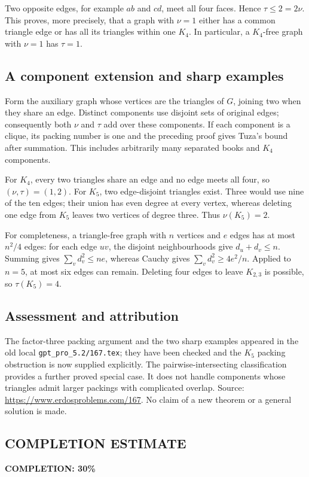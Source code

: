 Two opposite edges, for example $ab$ and $cd$, meet all four faces. Hence $\tau\le2=2\nu$. This proves, more precisely, that a graph with $\nu=1$ either has a common triangle edge or has all its triangles within one $K_4$. In particular, a $K_4$-free graph with $\nu=1$ has $\tau=1$.

\subsection*{A component extension and sharp examples}
Form the auxiliary graph whose vertices are the triangles of $G$, joining two when they share an edge. Distinct components use disjoint sets of original edges; consequently both $\nu$ and $\tau$ add over these components. If each component is a clique, its packing number is one and the preceding proof gives Tuza's bound after summation. This includes arbitrarily many separated books and $K_4$ components.

For $K_4$, every two triangles share an edge and no edge meets all four, so $(\nu,\tau)=(1,2)$.
For $K_5$, two edge-disjoint triangles exist. Three would use nine of the ten edges; their union has even degree at every vertex, whereas deleting one edge from $K_5$ leaves two vertices of degree three. Thus $\nu(K_5)=2$.

For completeness, a triangle-free graph with $n$ vertices and $e$ edges has at most $n^2/4$ edges: for each edge $uv$, the disjoint neighbourhoods give $d_u+d_v\le n$. Summing gives
$\sum_vd_v^2\le ne$, whereas Cauchy gives $\sum_vd_v^2\ge4e^2/n$. Applied to $n=5$, at most six edges can remain. Deleting four edges to leave $K_{2,3}$ is possible, so $\tau(K_5)=4$.

\subsection*{Assessment and attribution}
The factor-three packing argument and the two sharp examples appeared in the old local \texttt{gpt\_pro\_5.2/167.tex}; they have been checked and the $K_5$ packing obstruction is now supplied explicitly. The pairwise-intersecting classification provides a further proved special case. It does not handle components whose triangles admit larger packings with complicated overlap. Source: \url{https://www.erdosproblems.com/167}. No claim of a new theorem or a general solution is made.
\subsection*{COMPLETION ESTIMATE}
\textbf{COMPLETION: 30\%}
